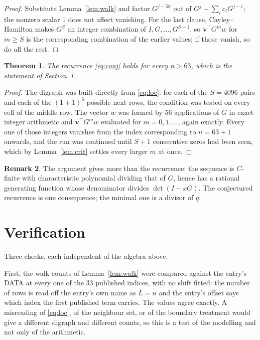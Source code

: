 \documentclass[11pt,a4paper]{article}
\theoremstyle{plain}
\newtheorem{theorem}{Theorem}
\theoremstyle{definition}
\newtheorem{remark}[theorem]{Remark}
\begin{document}
\begin{proof}
Substitute Lemma~\ref{lem:walk} and factor $G^{j-56}$ out of
$G^{j}-\sum_ic_iG^{j-i}$; the nonzero scalar $1$ does not affect
vanishing. For the last clause, Cayley--Hamilton makes $G^{S}$ an integer combination of
$I,G,\dots,G^{S-1}$, so $\mathbf{v}^{\!\top}G^{m}w$ for $m\ge S$ is the corresponding
combination of the earlier values; if those vanish, so do all the rest.
\end{proof}

\begin{theorem}
The recurrence \eqref{eq:conj} holds for every $n>63$, which is the statement of
Section~1.
\end{theorem}

\begin{proof}
The digraph was built directly from \eqref{eq:loc}: for each of the $S=4096$ pairs and each
of the $(1+1)^{6}$ possible next rows, the condition was tested on every cell of
the middle row. The vector $w$ was formed by $56$ applications of $G$ in exact integer
arithmetic and $\mathbf{v}^{\!\top}G^{m}w$ evaluated for $m=0,1,\dots$, again exactly.
Every one of those integers vanishes from the index corresponding to $n=63+1$ onwards,
and the run was continued until $S+1$ consecutive zeros had been seen, which by
Lemma~\ref{lem:crit} settles every larger $m$ at once.
\end{proof}

\begin{remark}
The argument gives more than the recurrence: the sequence is $C$-finite with characteristic
polynomial dividing that of $G$, hence has a rational generating function whose denominator
divides $\det(I-xG)$. The conjectured recurrence is one consequence; the minimal one is a
divisor of $q$.
\end{remark}

\section{Verification}

Three checks, each independent of the algebra above.

First, the walk counts of Lemma~\ref{lem:walk} were compared against the entry's DATA at
every one of the $33$ published indices, with no shift fitted: the number of rows is
read off the entry's own name as $L=n$ and the entry's offset says which index the first
published term carries. The values agree exactly. A misreading of \eqref{eq:loc}, of the
neighbour set, or of the boundary treatment would give a different digraph and different
counts, so this is a test of the modelling and not only of the arithmetic.
\end{document}

